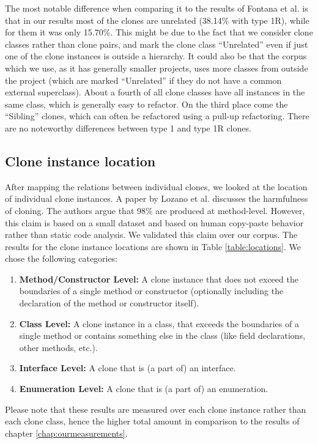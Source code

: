 The most notable difference when comparing it to the results of Fontana et al. \cite{fontana2015duplicated} is that in our results most of the clones are unrelated (38.14\% with type 1R), while for them it was only 15.70\%. This might be due to the fact that we consider clone classes rather than clone pairs, and mark the clone class ``Unrelated'' even if just one of the clone instances is outside a hierarchy. It could also be that the corpus which we use, as it has generally smaller projects, uses more classes from outside the project (which are marked ``Unrelated'' if they do not have a common external superclass). About a fourth of all clone classes have all instances in the same class, which is generally easy to refactor. On the third place come the ``Sibling'' clones, which can often be refactored using a pull-up refactoring. There are no noteworthy differences between type 1 and type 1R clones.

\subsection{Clone instance location}\label{chap:clonelocation}
After mapping the relations between individual clones, we looked at the location of individual clone instances. A paper by Lozano et al. \cite{lozano2007evaluating} discusses the harmfulness of cloning. The authors argue that 98\% are produced at method-level. However, this claim is based on a small dataset and based on human copy-paste behavior rather than static code analysis. We validated this claim over our corpus. The results for the clone instance locations are shown in Table \ref{table:locations}. We chose the following categories:
\begin{enumerate}
  \item \textbf{Method/Constructor Level:} A clone instance that does not exceed the boundaries of a single method or constructor (optionally including the declaration of the method or constructor itself).
  \item \textbf{Class Level:} A clone instance in a class, that exceeds the boundaries of a single method or contains something else in the class (like field declarations, other methods, etc.).
  \item \textbf{Interface Level:} A clone that is (a part of) an interface.
  \item \textbf{Enumeration Level:} A clone that is (a part of) an enumeration.
\end{enumerate}

Please note that these results are measured over each clone instance rather than each clone class, hence the higher total amount in comparison to the results of chapter \ref{chap:ourmeasurements}.

